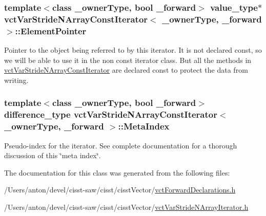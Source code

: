 \subsubsection[{Element\+Pointer}]{\setlength{\rightskip}{0pt plus 5cm}template$<$class \+\_\+owner\+Type, bool \+\_\+forward$>$ value\+\_\+type$\ast$ {\bf vct\+Var\+Stride\+N\+Array\+Const\+Iterator}$<$ \+\_\+owner\+Type, \+\_\+forward $>$\+::Element\+Pointer\hspace{0.3cm}{\ttfamily [protected]}}\label{classvct_var_stride_n_array_const_iterator_ac19e4e3a7c753b4893fd939d5d4077b1}
Pointer to the object being referred to by this iterator. It is not declared const, so we will be able to use it in the non const iterator class. But all the methods in \hyperlink{classvct_var_stride_n_array_const_iterator}{vct\+Var\+Stride\+N\+Array\+Const\+Iterator} are declared const to protect the data from writing. \hypertarget{classvct_var_stride_n_array_const_iterator_a6f62ef67435fdd9f972f2f29cd0a011b}{}
\subsubsection[{Meta\+Index}]{\setlength{\rightskip}{0pt plus 5cm}template$<$class \+\_\+owner\+Type, bool \+\_\+forward$>$ difference\+\_\+type {\bf vct\+Var\+Stride\+N\+Array\+Const\+Iterator}$<$ \+\_\+owner\+Type, \+\_\+forward $>$\+::Meta\+Index\hspace{0.3cm}{\ttfamily [protected]}}\label{classvct_var_stride_n_array_const_iterator_a6f62ef67435fdd9f972f2f29cd0a011b}
Pseudo-\/index for the iterator. See complete documentation for a thorough discussion of this \char`\"{}meta index\char`\"{}. 

The documentation for this class was generated from the following files\+:\begin{DoxyCompactItemize}
\item 
/\+Users/anton/devel/cisst-\/saw/cisst/cisst\+Vector/\hyperlink{vct_forward_declarations_8h}{vct\+Forward\+Declarations.\+h}\item 
/\+Users/anton/devel/cisst-\/saw/cisst/cisst\+Vector/\hyperlink{vct_var_stride_n_array_iterator_8h}{vct\+Var\+Stride\+N\+Array\+Iterator.\+h}\end{DoxyCompactItemize}
